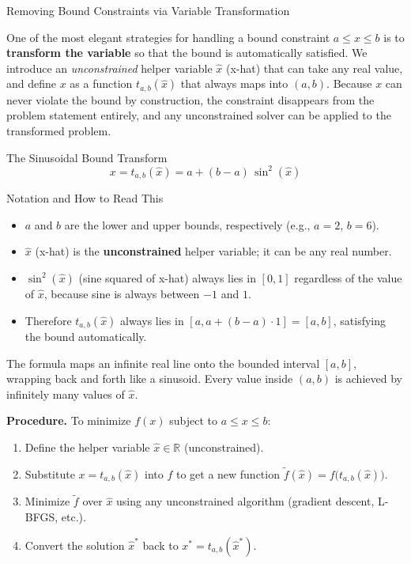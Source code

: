 \documentclass[aspectratio=169,10pt]{beamer}
\newcommand{\R}{\mathbb{R}}
\begin{document}
\begin{frame}[allowframebreaks]{Removing Bound Constraints via Variable Transformation}

  One of the most elegant strategies for handling a bound constraint
  $a \le x \le b$ is to \textbf{transform the variable} so that the bound is
  automatically satisfied.  We introduce an \emph{unconstrained} helper
  variable $\hat{x}$ (x-hat) that can take any real value, and define $x$ as
  a function $t_{a,b}(\hat{x})$ that always maps into $(a, b)$.  Because $x$
  can never violate the bound by construction, the constraint disappears from
  the problem statement entirely, and any unconstrained solver can be applied to
  the transformed problem.

  \begin{block}{The Sinusoidal Bound Transform}
    \[
      x = t_{a,b}(\hat{x}) = a + (b - a)\,\sin^2(\hat{x})
    \]
  \end{block}

  \begin{block}{Notation and How to Read This}
    \begin{itemize}
      \item $a$ and $b$ are the lower and upper bounds, respectively
            (e.g., $a = 2$, $b = 6$).
      \item $\hat{x}$ (x-hat) is the \textbf{unconstrained} helper variable;
            it can be any real number.
      \item $\sin^2(\hat{x})$ (sine squared of x-hat) always lies in $[0, 1]$
            regardless of the value of $\hat{x}$, because sine is always between
            $-1$ and $1$.
      \item Therefore $t_{a,b}(\hat{x})$ always lies in $[a, a + (b-a) \cdot 1]
            = [a, b]$, satisfying the bound automatically.
    \end{itemize}
    The formula maps an infinite real line onto the bounded interval $[a, b]$,
    wrapping back and forth like a sinusoid.  Every value inside $(a, b)$ is
    achieved by infinitely many values of $\hat{x}$.
  \end{block}

  \framebreak

  \textbf{Procedure.}  To minimize $f(x)$ subject to $a \le x \le b$:
  \begin{enumerate}
    \item Define the helper variable $\hat{x} \in \R$ (unconstrained).
    \item Substitute $x = t_{a,b}(\hat{x})$ into $f$ to get a new function
          $\tilde{f}(\hat{x}) = f\!\bigl(t_{a,b}(\hat{x})\bigr)$.
    \item Minimize $\tilde{f}$ over $\hat{x}$ using any unconstrained
          algorithm (gradient descent, L-BFGS, etc.).
    \item Convert the solution $\hat{x}^*$ back to $x^* = t_{a,b}(\hat{x}^*)$.
  \end{enumerate}


\end{frame}
\end{document}
